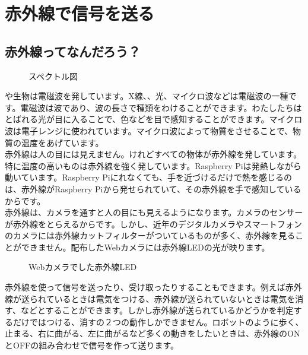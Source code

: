 \newpage
\section{赤外線で信号を送る}
\subsection{赤外線ってなんだろう？}

\begin{figure}[H]
\centering

    \caption{スペクトル図}

\end{figure}

や生物は電磁波を発しています。X線、、光、マイクロ波などは電磁波の一種です。電磁波は波であり、波の長さで種類をわけることができます。わたしたちはとばれる光が目に入ることで、色などを目で感知することができます。マイクロ波は電子レンジに使われています。マイクロ波によって物質をさせることで、物質の温度をあげています。\\

赤外線は人の目には見えません。けれどすべての物体が赤外線を発しています。特に温度の高いものは赤外線を強く発しています。Raspberry Piは発熱しながら動いています。Raspberry Piにれなくても、手を近づけるだけで熱を感じるのは、赤外線がRaspberry Piから発せられていて、その赤外線を手で感知しているからです。\\

赤外線は、カメラを通すと人の目にも見えるようになります。カメラのセンサーが赤外線をとらえるからです。しかし、近年のデジタルカメラやスマートフォンのカメラには赤外線カットフィルターがついているものが多く、赤外線を見ることができません。配布したWebカメラには赤外線LEDの光が映ります。

\begin{figure}[H]
    \centering
    
        \caption{Webカメラでした赤外線LED}

\end{figure}

赤外線を使って信号を送ったり、受け取ったりすることもできます。例えば赤外線が送られているときは電気をつける、赤外線が送られていないときは電気を消す、などとすることができます。しかし赤外線が送られているかどうかを判定するだけではつける、消すの２つの動作しかできません。ロボットのように歩く、止まる、右に曲がる、左に曲がるなど多くの動きをしたいときは、赤外線のONとOFFの組み合わせで信号を作って送ります。

